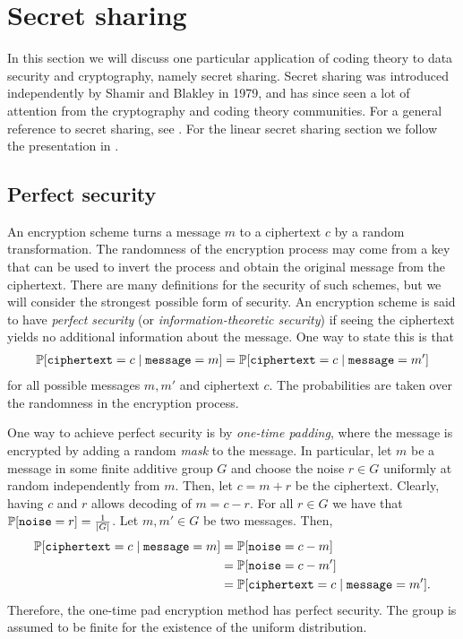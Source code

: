 \documentclass[../main.tex]{subfiles}
\begin{document}
\section{Secret sharing}

In this section we will discuss one particular application of coding theory to data security and cryptography, namely secret sharing. Secret sharing was introduced independently by Shamir and Blakley in 1979, and has since seen a lot of attention from the cryptography and coding theory communities. For a general reference to secret sharing, see \cite{padro2012lecture}. For the linear secret sharing section we follow the presentation in \cite{chen2007secure}.

\subsection{Perfect security}

An encryption scheme turns a message $m$ to a ciphertext $c$ by a random transformation. The randomness of the encryption process may come from a key that can be used to invert the process and obtain the original message from the ciphertext. There are many definitions for the security of such schemes, but we will consider the strongest possible form of security. An encryption scheme is said to have \emph{perfect security} (or \emph{information-theoretic security}) if seeing the ciphertext yields no additional information about the message. One way to state this is that
\begin{align*}
    \P[\texttt{ciphertext} = c \mid \texttt{message} = m] = \P[\texttt{ciphertext} = c \mid \texttt{message} = m']
\end{align*}
for all possible messages $m, m'$ and ciphertext $c$. The probabilities are taken over the randomness in the encryption process.

One way to achieve perfect security is by \emph{one-time padding}, where the message is encrypted by adding a random \emph{mask} to the message. In particular, let $m$ be a message in some finite additive group $G$ and choose the noise $r \in G$ uniformly at random independently from $m$. Then, let $c = m + r$ be the ciphertext. Clearly, having $c$ and $r$ allows decoding of $m = c - r$. For all $r \in G$ we have that $\P[\texttt{noise} = r] = \tfrac{1}{\lvert G \rvert}$. Let $m, m' \in G$ be two messages. Then,
\begin{align*}
    \P[\texttt{ciphertext} = c \mid \texttt{message} = m] &= \P[\texttt{noise} = c - m] \\
    &= \P[\texttt{noise} = c - m'] \\
    &= \P[\texttt{ciphertext} = c \mid \texttt{message} = m'].
\end{align*}
Therefore, the one-time pad encryption method has perfect security. The group is assumed to be finite for the existence of the uniform distribution.
\end{document}
